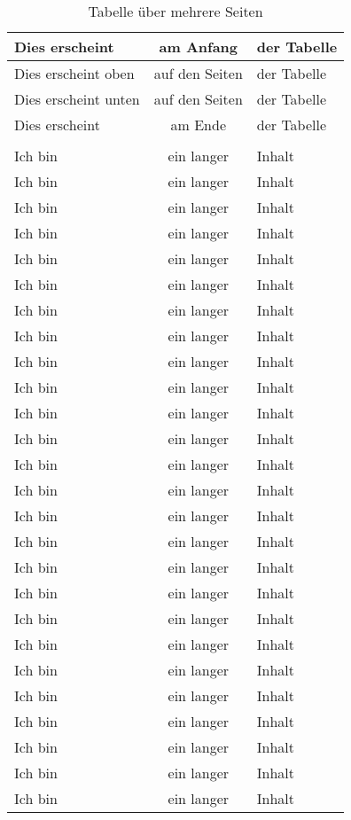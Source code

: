 \documentclass[
12pt,
ngerman
]{scrreprt}
\begin{document}
\begin{longtable}{lcl}
\hline\hline
Dies erscheint & am Anfang & der Tabelle \\
\hline\hline
\endfirsthead
\hline
Dies erscheint oben & auf den Seiten & der Tabelle \\
\hline
\endhead
\hline
Dies erscheint unten & auf den Seiten & der Tabelle \\
\hline
\endfoot
\hline\hline
Dies erscheint & am Ende & der Tabelle \\
\hline\hline
\caption{Tabelle über mehrere Seiten} \\
\endlastfoot
Ich bin & ein langer & Inhalt \\
Ich bin & ein langer & Inhalt \\
Ich bin & ein langer & Inhalt \\
Ich bin & ein langer & Inhalt \\
Ich bin & ein langer & Inhalt \\
Ich bin & ein langer & Inhalt \\
Ich bin & ein langer & Inhalt \\
Ich bin & ein langer & Inhalt \\
Ich bin & ein langer & Inhalt \\
Ich bin & ein langer & Inhalt \\
Ich bin & ein langer & Inhalt \\
Ich bin & ein langer & Inhalt \\
Ich bin & ein langer & Inhalt \\
Ich bin & ein langer & Inhalt \\
Ich bin & ein langer & Inhalt \\
Ich bin & ein langer & Inhalt \\
Ich bin & ein langer & Inhalt \\
Ich bin & ein langer & Inhalt \\
Ich bin & ein langer & Inhalt \\
Ich bin & ein langer & Inhalt \\
Ich bin & ein langer & Inhalt \\
Ich bin & ein langer & Inhalt \\
Ich bin & ein langer & Inhalt \\
Ich bin & ein langer & Inhalt \\
Ich bin & ein langer & Inhalt \\
Ich bin & ein langer & Inhalt \\

\end{longtable}
\end{document}
